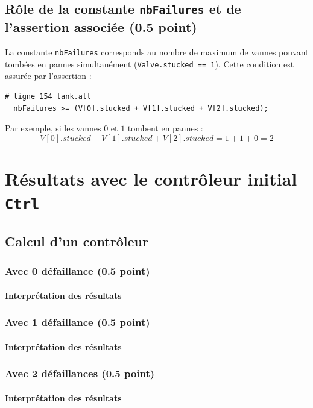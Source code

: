 \documentclass[a4paper]{book}
\begin{document}
\subsection{Rôle de la constante {\tt nbFailures} et de l'assertion associée (0.5 point)}

La constante \texttt{nbFailures} corresponds au nombre de maximum de vannes pouvant tombées
en pannes simultanément (\texttt{Valve.stucked == 1}).
Cette condition est assurée par l'assertion :
\begin{verbatim}
# ligne 154 tank.alt
  nbFailures >= (V[0].stucked + V[1].stucked + V[2].stucked);
\end{verbatim}

Par exemple, si les vannes $0$ et $1$ tombent en pannes :
$$
V[0].stucked + V[1].stucked + V[2].stucked = 1 + 1 + 0 = 2
$$

\section{Résultats avec le contrôleur initial {\tt Ctrl}}
\subsection{Calcul d'un contrôleur}
\subsubsection{Avec 0 défaillance (0.5 point)}

\paragraph{Interprétation des résultats}

\subsubsection{Avec 1 défaillance (0.5 point)}

\paragraph{Interprétation des résultats}

\subsubsection{Avec 2 défaillances (0.5 point)}

\paragraph{Interprétation des résultats}
\end{document}
